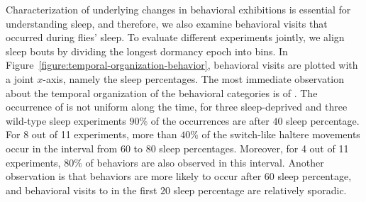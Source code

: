 Characterization of underlying changes in behavioral exhibitions is essential for understanding sleep, and therefore, we also examine behavioral visits that occurred during flies' sleep.
To evaluate different experiments jointly, we align sleep bouts by dividing the longest dormancy epoch into bins.
In Figure~\ref{figure:temporal-organization-behavior}, behavioral visits are plotted with a joint $x$-axis, namely the sleep percentages.
The most immediate observation about the temporal organization of the behavioral categories is of \HaltereSwitch.
The occurrence of \HaltereSwitch is not uniform along the time, for three sleep-deprived and three wild-type sleep experiments $90\%$ of the \HaltereSwitch occurrences are after $40$ sleep percentage.
For 8 out of 11 experiments, more than $40\%$ of the switch-like haltere movements occur in the interval from $60$ to $80$ sleep percentages.
Moreover, for 4 out of 11 experiments, $80\%$ of \HaltereSwitch behaviors are also observed in this interval.
Another observation is that \Grooming behaviors are more likely to occur after $60$ sleep percentage, and behavioral visits to \Grooming in the first $20$ sleep percentage are relatively sporadic.
